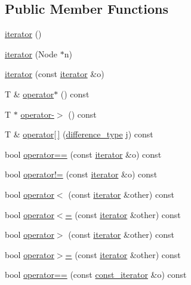 \subsection*{Public Member Functions}
\begin{DoxyCompactItemize}
\item 
\hyperlink{class_q_list_1_1iterator_ac2334d3597b063090a5245ec44786436}{iterator} ()
\item 
\hyperlink{class_q_list_1_1iterator_a03dae5ce262e310ef83ed2f9384f3ef5}{iterator} (Node $\ast$n)
\item 
\hyperlink{class_q_list_1_1iterator_a7cb730ca6e7c0553e43f18f66068ac24}{iterator} (const \hyperlink{class_q_list_1_1iterator}{iterator} \&o)
\item 
T \& \hyperlink{class_q_list_1_1iterator_a9cd6d05402cf6ebed3dfd2b727edc2a2}{operator$\ast$} () const 
\item 
T $\ast$ \hyperlink{class_q_list_1_1iterator_aa64e03c9f94250dc82ef865ee7e6c557}{operator-\/$>$} () const 
\item 
T \& \hyperlink{class_q_list_1_1iterator_a960fdd912273a727a6eaf6a4429e98d2}{operator\mbox{[}$\,$\mbox{]}} (\hyperlink{class_q_list_1_1iterator_a6360336f54f546a21d69e233f8334fc5}{difference\+\_\+type} j) const 
\item 
bool \hyperlink{class_q_list_1_1iterator_a75de13cfc3058f4dcd5eaa2aa892d27e}{operator==} (const \hyperlink{class_q_list_1_1iterator}{iterator} \&o) const 
\item 
bool \hyperlink{class_q_list_1_1iterator_a5607c6d4b8de3abfa1860ecf9c8e080c}{operator!=} (const \hyperlink{class_q_list_1_1iterator}{iterator} \&o) const 
\item 
bool \hyperlink{class_q_list_1_1iterator_a5be0a12d51850af28383d1048c8f04c0}{operator$<$} (const \hyperlink{class_q_list_1_1iterator}{iterator} \&other) const 
\item 
bool \hyperlink{class_q_list_1_1iterator_ac793fb6f19517bb7c87b7a7f0bce5c4b}{operator$<$=} (const \hyperlink{class_q_list_1_1iterator}{iterator} \&other) const 
\item 
bool \hyperlink{class_q_list_1_1iterator_a1295ca951b546ccfdd84c89d83bef359}{operator$>$} (const \hyperlink{class_q_list_1_1iterator}{iterator} \&other) const 
\item 
bool \hyperlink{class_q_list_1_1iterator_a9ee24a4a8ba02bc7bd4c08465bbb9abd}{operator$>$=} (const \hyperlink{class_q_list_1_1iterator}{iterator} \&other) const 
\item 
bool \hyperlink{class_q_list_1_1iterator_a7bc9996f3154ce695276731e8d55c33b}{operator==} (const \hyperlink{class_q_list_1_1const__iterator}{const\+\_\+iterator} \&o) const 

\end{DoxyCompactItemize}

